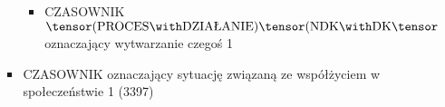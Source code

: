 \documentclass[a4paper,12pt]{article}
\begin{document}
\begin{itemize}
\begin{itemize}
\begin{itemize}
      \begin{itemize}
      \item CZASOWNIK $\tensor(\text{PROCES}\with\text{DZIAŁANIE})\tensor(\text{NDK}\with\text{DK}\tensor$ oznaczający wytwarzanie czegoś 1
      \end{itemize}
    \item CZASOWNIK oznaczający sytuację związaną ze współżyciem w społeczeństwie 1  (3397)
%       
%   

\end{itemize}
\end{itemize}
\end{itemize}
\end{document}
